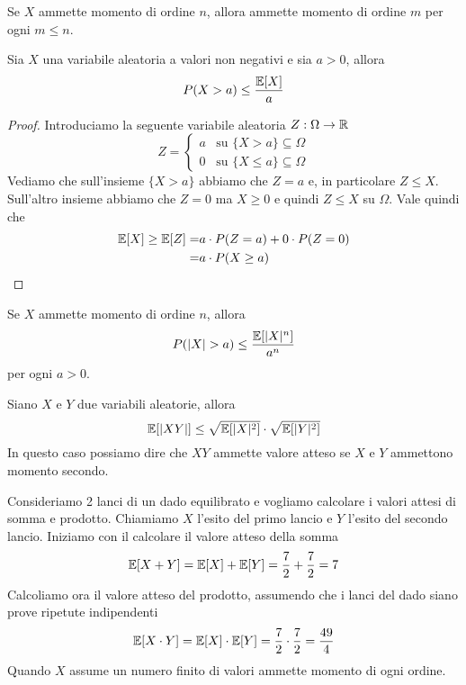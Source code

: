 \begin{proposition}
	Se $X$ ammette momento di ordine $n$, allora ammette momento di ordine $m$ per ogni $m \leq n$.
\end{proposition}

\begin{proposition}
	Sia $X$ una variabile aleatoria a valori non negativi e sia $a>0$, allora
	\[ P(X > a) \leq \frac{\mathbb{E}[X]}{a} \]
	\begin{proof}
		Introduciamo la seguente variabile aleatoria $Z : \Omega \to \mathbb{R}$
		\[
			Z = \begin{cases}
				a & \text{su } \{ X > a \} \subseteq \Omega    \\
				0 & \text{su } \{ X \leq a \} \subseteq \Omega
			\end{cases}
		\]
		Vediamo che sull'insieme $\{ X > a \}$ abbiamo che $Z = a$ e, in particolare $Z \leq X$.
		Sull'altro insieme abbiamo che $Z = 0$ ma $X \geq 0$ e quindi $Z \leq X$ su $\Omega$.
		Vale quindi che
		\begin{align*}
			\mathbb{E}[X] \geq \mathbb{E}[Z] = & a \cdot P(Z = a) + 0 \cdot P(Z = 0) \\
			=                  & a \cdot P(X \geq a)
		\end{align*}
	\end{proof}
\end{proposition}

\begin{corollary}
	Se $X$ ammette momento di ordine $n$, allora
	\[ P(|X| > a) \leq \frac{\mathbb{E}[|X|^n]}{a^n} \]
	per ogni $a > 0$.
\end{corollary}

\begin{proposition}
	Siano $X$ e $Y$ due variabili aleatorie, allora
	\[ \mathbb{E}[|XY|] \leq \sqrt{\mathbb{E}[|X|^2]} \cdot \sqrt{\mathbb{E}[|Y|^2]} \]
	In questo caso possiamo dire che $XY$ ammette valore atteso se $X$ e $Y$ ammettono momento
	secondo.
\end{proposition}

\begin{example}
	Consideriamo 2 lanci di un dado equilibrato e vogliamo calcolare i valori attesi di somma e
	prodotto. Chiamiamo $X$ l'esito del primo lancio e $Y$ l'esito del secondo lancio. Iniziamo
	con il calcolare il valore atteso della somma
	\[ \mathbb{E}[X + Y] = \mathbb{E}[X] + \mathbb{E}[Y] = \frac{7}{2} + \frac{7}{2} = 7 \]
	Calcoliamo ora il valore atteso del prodotto, assumendo che i lanci del dado siano prove
	ripetute indipendenti
	\[ \mathbb{E}[X \cdot Y] = \mathbb{E}[X] \cdot \mathbb{E}[Y] = \frac{7}{2} \cdot \frac{7}{2} = \frac{49}{4} \]
	Quando $X$ assume un numero finito di valori ammette momento di ogni ordine.
\end{example}

